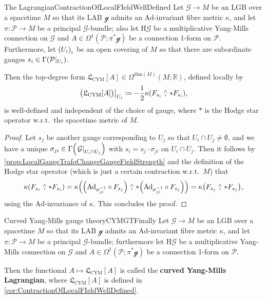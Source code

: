 \documentclass[reqno,a4paper,oneside]{amsart}
\theoremstyle{plain}
\theoremstyle{remark}
\theoremstyle{definition}
\begin{document}
\begin{corollaries}{The Lagrangian}{ContractionOfLocalFIeldWellDefined}
Let $\mathcal{G} \to M$ be an LGB over a spacetime $M$ so that its LAB $\mathcal{g}$ admits an $\mathrm{Ad}$-invariant fibre metric $\kappa$, and let $\pi\colon\mathcal{P} \to M$ be a principal $\mathcal{G}$-bundle; also let $\mathrm{H}\mathcal{G}$ be a multiplicative Yang-Mills connection on $\mathcal{G}$ and $A \in \Omega^1(\mathcal{P}; \pi^*\mathcal{g})$ be a connection 1-form on $\mathcal{P}$. Furthermore, let $\mleft( U_i \mright)_i$ be an open covering of $M$ so that there are subordinate gauges $s_i \in \Gamma\mleft(\mathcal{P}|_{U_i}\mright)$.

Then the top-degree form $\mathfrak{L}_{\mathrm{CYM}}[A] \in \Omega^{\mathrm{dim}(M)}(M; \mathbb{R})$, defined locally by
\begin{equation*}
\mleft.\bigl(\mathfrak{L}_{\mathrm{CYM}}[A]\bigr)\mright|_{U_i}
\coloneqq 
- \frac{1}{2} \kappa \mleft( F_{s_i} \stackrel{\wedge}{,} *F_{s_i} \mright),
\end{equation*}
is well-defined and independent of the choice of gauge, where $*$ is the Hodge star operator w.r.t.\ the spacetime metric of $M$.
\end{corollaries}

\begin{proof}
\leavevmode\newline
Let $s_j$ be another gauge corresponding to $U_j$ so that $U_i \cap U_j \neq \emptyset$, and we have a unique $\sigma_{ji} \in \Gamma\mleft( \mleft.\mathcal{G}\mright|_{U_i \cap U_j} \mright)$ with $s_i = s_j \cdot \sigma_{ji}$ on $U_i \cap U_j$. Then it follows by \ref{prop:LocalGaugeTrafoChangeGaugeFieldStrength} and the definition of the Hodge star operator (which is just a certain contraction w.r.t.\ $M$) that
\begin{equation*}
\kappa \mleft( F_{s_i} \stackrel{\wedge}{,} *F_{s_i} \mright)
=
\kappa \mleft( \mleft(\mathrm{Ad}_{\sigma_{ji}^{-1}}\circ F_{s_j} \mright) \stackrel{\wedge}{,} *\mleft( \mathrm{Ad}_{\sigma_{ji}^{-1}}\circ F_{s_j} \mright) \mright)
=
\kappa \mleft( F_{s_j} \stackrel{\wedge}{,} *F_{s_j} \mright),
\end{equation*}
using the $\mathrm{Ad}$-invariance of $\kappa$. This concludes the proof.
\end{proof}

\begin{definitions}{Curved Yang-Mills gauge theory}{CYMGTFinally}
Let $\mathcal{G} \to M$ be an LGB over a spacetime $M$ so that its LAB $\mathcal{g}$ admits an $\mathrm{Ad}$-invariant fibre metric $\kappa$, and let $\pi\colon\mathcal{P} \to M$ be a principal $\mathcal{G}$-bundle; furthermore let $\mathrm{H}\mathcal{G}$ be a multiplicative Yang-Mills connection on $\mathcal{G}$ and $A \in \Omega^1(\mathcal{P}; \pi^*\mathcal{g})$ be a connection 1-form on $\mathcal{P}$.

Then the functional $A \mapsto \mathfrak{L}_{\mathrm{CYM}}[A]$ is called the \textbf{curved Yang-Mills Lagrangian}, where $\mathfrak{L}_{\mathrm{CYM}}[A]$ is defined in \ref{cor:ContractionOfLocalFIeldWellDefined}.
\end{definitions}
\end{document}
